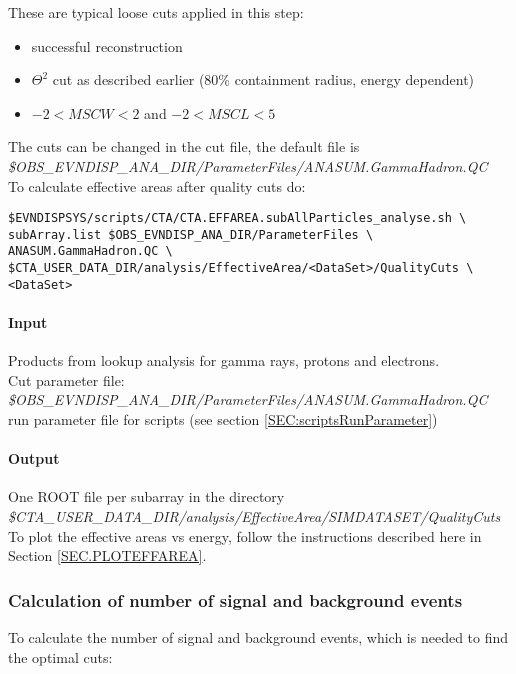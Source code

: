\documentclass[titlepage,a4paper,twoside,11pt]{report}
\begin{document}
These are typical loose cuts applied in this step:
\begin{itemize}
\item successful reconstruction
\item $\Theta^2$ cut as described earlier (80\% containment radius, energy dependent)
\item $-2<MSCW<2$ and $-2<MSCL<5$
\end{itemize}
The cuts can be changed in the cut file, the default file is\\
{\it \$OBS\_EVNDISP\_ANA\_DIR/ParameterFiles/ANASUM.GammaHadron.QC}\\

To calculate effective areas after quality cuts do:

\begin{lstlisting}
$EVNDISPSYS/scripts/CTA/CTA.EFFAREA.subAllParticles_analyse.sh \
subArray.list $OBS_EVNDISP_ANA_DIR/ParameterFiles \
ANASUM.GammaHadron.QC \
$CTA_USER_DATA_DIR/analysis/EffectiveArea/<DataSet>/QualityCuts \
<DataSet> 
\end{lstlisting}

\paragraph{Input} 
Products from lookup analysis for gamma rays, protons and electrons. \\
Cut parameter file: \\
{\it \$OBS\_EVNDISP\_ANA\_DIR/ParameterFiles/ANASUM.GammaHadron.QC}\\
run parameter file for scripts (see section \ref{SEC:scriptsRunParameter})

\paragraph{Output}

One ROOT file per subarray in the directory  \\
{\it \$CTA\_USER\_DATA\_DIR/analysis/EffectiveArea/SIMDATASET/QualityCuts} \\
To plot the effective areas vs energy, follow the instructions described here in Section \ref{SEC.PLOTEFFAREA}.

\subsubsection{Calculation of number of signal and background events}

To calculate the number of signal and background events, which is needed to find the optimal cuts:
\end{document}
